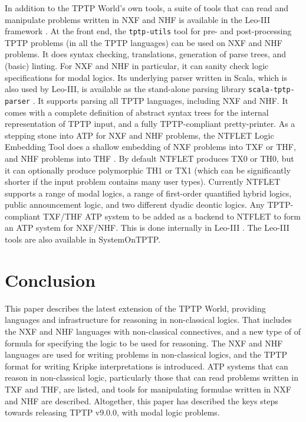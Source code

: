 \documentclass[runningheads]{llncs}
\begin{document}
In addition to the TPTP World's own tools, a suite of tools that can read and manipulate 
problems written in NXF and NHF is available in the Leo-III framework \cite{SB21}.
At the front end, the {\tt tptp-utils} tool \cite{Ste22-TU} for pre- and post-processing TPTP 
problems (in all the TPTP languages) can be used on NXF and NHF problems.
It does syntax checking, translations, generation of parse trees, and (basic) linting.
For NXF and NHF in particular, it can sanity check logic specifications for modal logics.
Its underlying parser written in Scala, which is also used by Leo-III, is available as the 
stand-alone parsing library {\tt scala-tptp-parser} \cite{Ste21}.
It supports parsing all TPTP languages, including NXF and NHF.
It comes with a complete definition of abstract syntax trees for the internal representation 
of TPTP input, and a fully TPTP-compliant pretty-printer. 
As a stepping stone into ATP for NXF and NHF problems, the NTFLET Logic Embedding Tool 
\cite{Ste22-LE} does a shallow embedding of NXF problems into TXF or THF, and NHF problems
into THF \cite{BP13,BR13,GSB17,GS18}.
By default NTFLET produces TX0 or TH0, but it can optionally produce polymorphic TH1 or TX1
(which can be significantly shorter if the input problem contains many user types).
Currently NTFLET supports a range of modal logics, a range of first-order quantified hybrid 
logics, public announcement logic, and two different dyadic deontic logics.
Any TPTP-compliant TXF/THF ATP system to be added as a backend to NTFLET to form an 
ATP system for NXF/NHF.
This is done internally in Leo-III \cite{SB21,Ste22}.
The Leo-III tools are also available in SystemOnTPTP.

\section{Conclusion}
\label{Conclusion}

This paper describes the latest extension of the TPTP World, providing languages and
infrastructure for reasoning in non-classical logics.
That includes the NXF and NHF languages with non-classical connectives, and a new type of
of formula for specifying the logic to be used for reasoning.
The NXF and NHF languages are used for writing problems in non-classical logics, and the
TPTP format for writing Kripke interpretations is introduced.
ATP systems that can reason in non-classical logic, particularly those that can read 
problems written in TXF and THF, are listed, and tools for manipulating formulae written in 
NXF and NHF are described.
Altogether, this paper has described the keys steps towards releasing TPTP v9.0.0,
with modal logic problems.
\end{document}
